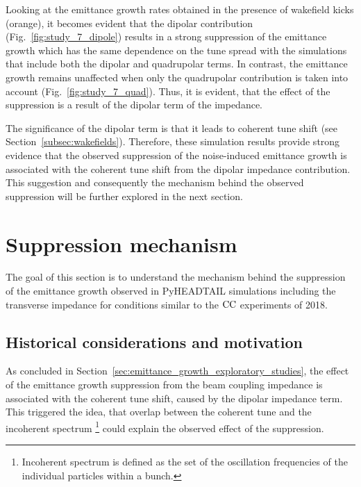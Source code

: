 Looking at the emittance growth rates obtained in the presence of wakefield kicks (orange), it becomes evident that the dipolar contribution (Fig.~\ref{fig:study_7_dipole}) results in a strong suppression of the emittance growth which has the same dependence on the tune spread with the simulations that include both the dipolar and quadrupolar terms. In contrast, the emittance growth remains unaffected when only the quadrupolar contribution is taken into account (Fig.~\ref{fig:study_7_quad}). Thus, it is evident, that the effect of the suppression is a result of the dipolar term of the impedance. 

The significance of the dipolar term is that it leads to coherent tune shift (see Section~\ref{subsec:wakefields}). Therefore, these simulation results provide strong evidence that the observed suppression of the noise-induced emittance growth is associated with the coherent tune shift from the dipolar impedance contribution. This suggestion and consequently the mechanism behind the observed suppression will be further explored in the next section.


\section{Suppression mechanism}\label{sec:suppression_mechanism}
The goal of this section is to understand the mechanism behind the suppression of the emittance growth observed in PyHEADTAIL simulations including the transverse impedance for conditions similar to the ${\mathrm{CC}}$ experiments of 2018. 


\subsection{Historical considerations and motivation}\label{subsec:past_studies_impedance_suppression_BB}

As concluded in Section~\ref{sec:emittance_growth_exploratory_studies}, the effect of the emittance growth suppression from the beam coupling impedance is associated with the coherent tune shift, caused by the dipolar impedance term. This triggered the idea, that overlap between the coherent tune and the incoherent spectrum \footnote{Incoherent spectrum is defined as the set of the oscillation frequencies of the individual particles within a bunch.} could explain the observed effect of the suppression. 

